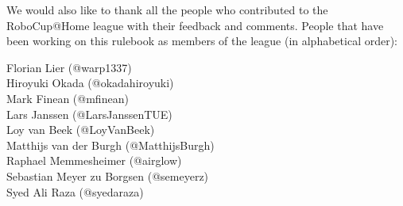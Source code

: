\noindent We would also like to thank all the people who contributed to the RoboCup@Home league with their feedback and comments.
People that have been working on this rulebook as members of the league (in alphabetical order):
\begin{center}
    \begin{minipage}{0.8\textwidth}
        \begin{multicols}{2}%
            \footnotesize
            \noindent%
            Florian Lier (@warp1337)\\
            Hiroyuki Okada (@okadahiroyuki)\\
            Mark Finean (@mfinean)\\
            Lars Janssen (@LarsJanssenTUE)\\
            \columnbreak%
            Loy van Beek (@LoyVanBeek)\\
            Matthijs van der Burgh (@MatthijsBurgh)\\
            Raphael Memmesheimer (@airglow)\\
            Sebastian Meyer zu Borgsen (@semeyerz)\\
            Syed Ali Raza (@syedaraza)
        \end{multicols}
    \end{minipage}
\end{center}


